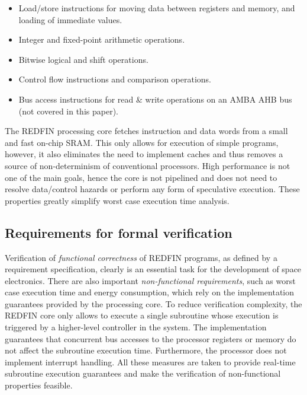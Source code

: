 \begin{itemize}
\item{Load/store instructions for moving data between registers and memory, and
loading of immediate values.}
\item{Integer and fixed-point arithmetic operations.}
\item{Bitwise logical and shift operations.}
\item{Control flow instructions and comparison operations.}
\item{Bus access instructions for read \& write operations on an AMBA AHB bus
(not covered in this paper).}
\end{itemize}

The REDFIN processing core fetches instruction and data words from a small and fast
on-chip SRAM. This only allows for execution of simple programs, however, it also
eliminates the need to implement caches and thus removes a source of non-determinism of
conventional processors. High performance is not one of the main goals, hence the
core is not pipelined and does not need to resolve data/control hazards or
perform any form of speculative execution. These properties greatly simplify
worst case execution time analysis.

\subsection{Requirements for formal verification}

Verification of \emph{functional correctness} of REDFIN programs, as defined by a
requirement specification, clearly is an essential task for the development of space
electronics. There are also important \emph{non-functional requirements}, such as
worst case execution time and energy consumption, which rely on the implementation
guarantees provided by the processing core. To reduce verification complexity,
the REDFIN core only allows to execute a single subroutine whose execution is triggered
by a higher-level controller in the system. The implementation guarantees that
concurrent bus accesses to the processor registers or memory do not affect
the subroutine execution time. Furthermore, the processor does not implement
interrupt handling. All these measures are taken to provide real-time
subroutine execution guarantees and make the verification of non-functional
properties feasible. %

